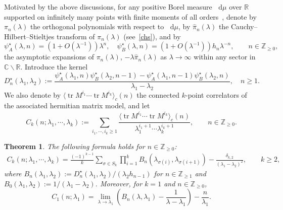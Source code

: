 \documentclass[a4paper]{article}
\theoremstyle{plain}
\newtheorem{thm}{Theorem}
\theoremstyle{definition}
\newcommand{\dif}{\mathop{}\!\mathrm{d}}
\newcommand{\ZZ}{\mathbb{Z}}
\newcommand{\RR}{\mathbb{R}}
\newcommand{\CC}{\mathbb{C}}
\DeclareMathOperator{\tr}{tr}
\begin{document}
Motivated by the above discussions, for any positive Borel measure $\dif\mu$ over $\RR$ supported on infinitely many points with finite moments of all orders~\cite{Deift,Konig}, denote by $\pi_n(\lambda)$ the orthogonal polynomials with respect to $\dif\mu$, by $\widehat\pi_n(\lambda)$ the 
	Cauchy--Hilbert--Stieltjes transform of $\pi_n(\lambda)$ (see~\eqref{chs}), and by
	\begin{equation}
		\psi_A^\star(\lambda,n)=(1+O(\lambda^{-1}))\lambda^n,\quad\psi_B^\star(\lambda,n)=(1+O(\lambda^{-1}))h_n\lambda^{-n}, \qquad n\in\mathbb{Z}_{\ge0},
	\end{equation}
	the asymptotic expansions of $\pi_n(\lambda)$, $-\lambda\widehat\pi_n(\lambda)$ as $\lambda\to\infty$ within any sector in $\CC\backslash\RR$. Introduce the kernel
\begin{equation} \label{dstar}
	D_n^\star(\lambda_1,\lambda_2):=\frac{\psi_A^\star(\lambda_1,n)\psi_B^\star(\lambda_2,n-1)-\psi_A^\star(\lambda_1,n-1)\psi_B^\star(\lambda_2,n)}{\lambda_1-\lambda_2},\quad n\ge1.
\end{equation}
We also denote by $\langle\tr M^{i_1}\cdots\tr M^{i_k}\rangle_c(n)$ the connected $k$-point correlators of the associated hermitian matrix model, and let
\begin{equation}
	C_k(n;\lambda_1,\cdots,\lambda_k):=\sum_{i_1,\cdots,i_k\ge1}\frac{\langle\tr M^{i_1}\cdots\tr M^{i_k}\rangle_c(n)}{\lambda_1^{i_1+1}\cdots\lambda_k^{i_k+1}},\qquad n\in\ZZ_{\ge0}.
\end{equation}	

	\begin{thm} \label{main}
		The following formula holds for $n\in\ZZ_{\ge0}$:
		\begin{align} \label{maineq}
			C_k(n;\lambda_1,\cdots,\lambda_k)=\frac{(-1)^{k-1}}{k}\sum_{\sigma\in S_k}\prod_{i=1}^kB_n(\lambda_{\sigma(i)},\lambda_{\sigma(i+1)})-\frac{\delta_{k,2}}{(\lambda_1-\lambda_2)^2},\qquad k\ge2,
		\end{align}
		where $B_n(\lambda_1,\lambda_2):=D_n^\star(\lambda_1,\lambda_2)/(\lambda_2h_{n-1})$ for $n\in\ZZ_{\ge1}$ and $B_0(\lambda_1,\lambda_2):=1/(\lambda_1-\lambda_2)$.
		Moreover, for $k=1$ and $n\in\ZZ_{\ge0}$,
		\begin{equation} 
			C_1(n;\lambda_1)=\lim_{\lambda\to\lambda_1}\left(B_n(\lambda,\lambda_1)-\frac{1}{\lambda-\lambda_1}\right)-\frac{n}{\lambda_1}.\label{maineq1}
		\end{equation}
	\end{thm}
\end{document}
